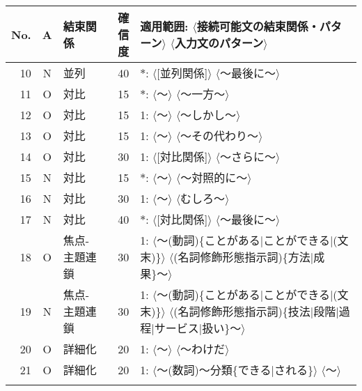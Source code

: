 {\noindent
\begin{tabular}{@{}r|c|lr|p{9cm}@{}} \hline \hline
No. & A & 結束関係 & 確信度 & 適用範囲: $\langle$接続可能文の結束関係・パターン$\rangle$ $\langle$入力文のパターン$\rangle$ \\ \hline\vspace*{-1mm}
10 & N & 並列 & 40 & $\ast$: $\langle$[並列関係]$\rangle$ $\langle$〜最後に〜$\rangle$ \\\vspace*{-1mm}
11 & O & 対比 & 15 & $\ast$: $\langle$〜$\rangle$ $\langle$〜一方〜$\rangle$ \\\vspace*{-1mm}
12 & O & 対比 & 15 & 1: $\langle$〜$\rangle$ $\langle$〜しかし〜$\rangle$ \\\vspace*{-1mm}
13 & O & 対比 & 15 & 1: $\langle$〜$\rangle$ $\langle$〜その代わり〜$\rangle$ \\\vspace*{-1mm}
14 & O & 対比 & 30 & 1: $\langle$[対比関係]$\rangle$ $\langle$〜さらに〜$\rangle$ \\\vspace*{-1mm}
15 & N & 対比 & 15 & $\ast$: $\langle$〜$\rangle$ $\langle$〜対照的に〜$\rangle$ \\\vspace*{-1mm}
16 & N & 対比 & 30 & 1: $\langle$〜$\rangle$ $\langle$むしろ〜$\rangle$ \\\vspace*{-1mm}
17 & N & 対比 & 40 & $\ast$: $\langle$[対比関係]$\rangle$ $\langle$〜最後に〜$\rangle$ \\\vspace*{-1mm}
18 & O & 焦点-主題連鎖 & 30 & 1: $\langle$〜(動詞)\{ことがある$|$ことができる$|$(文末)\}$\rangle$ $\langle$(名詞修飾形態指示詞)\{方法$|$成果\}〜$\rangle$ \\\vspace*{-1mm}
19 & N & 焦点-主題連鎖 & 30 & 1: $\langle$〜(動詞)\{ことがある$|$ことができる$|$(文末)\}$\rangle$ $\langle$(名詞修飾形態指示詞)\{技法$|$段階$|$過程$|$サービス$|$扱い\}〜$\rangle$ \\\vspace*{-1mm}
20 & O & 詳細化 & 20 & 1: $\langle$〜$\rangle$ $\langle$〜わけだ$\rangle$ \\\vspace*{-1mm}
21 & O & 詳細化 & 20 & 1: $\langle$〜(数詞)〜分類\{できる$|$される\}$\rangle$ $\langle$〜$\rangle$ \\\vspace*{-1mm}

\end{tabular}}
